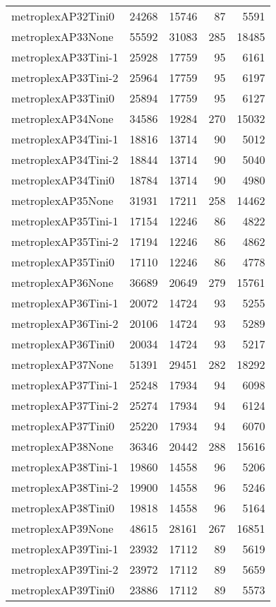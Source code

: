 \begin{longtable}{lrrrr}
metroplexAP32Tini0 & 24268 & 15746 & 87 & 5591 \\
metroplexAP33None & 55592 & 31083 & 285 & 18485 \\
metroplexAP33Tini-1 & 25928 & 17759 & 95 & 6161 \\
metroplexAP33Tini-2 & 25964 & 17759 & 95 & 6197 \\
metroplexAP33Tini0 & 25894 & 17759 & 95 & 6127 \\
metroplexAP34None & 34586 & 19284 & 270 & 15032 \\
metroplexAP34Tini-1 & 18816 & 13714 & 90 & 5012 \\
metroplexAP34Tini-2 & 18844 & 13714 & 90 & 5040 \\
metroplexAP34Tini0 & 18784 & 13714 & 90 & 4980 \\
metroplexAP35None & 31931 & 17211 & 258 & 14462 \\
metroplexAP35Tini-1 & 17154 & 12246 & 86 & 4822 \\
metroplexAP35Tini-2 & 17194 & 12246 & 86 & 4862 \\
metroplexAP35Tini0 & 17110 & 12246 & 86 & 4778 \\
metroplexAP36None & 36689 & 20649 & 279 & 15761 \\
metroplexAP36Tini-1 & 20072 & 14724 & 93 & 5255 \\
metroplexAP36Tini-2 & 20106 & 14724 & 93 & 5289 \\
metroplexAP36Tini0 & 20034 & 14724 & 93 & 5217 \\
metroplexAP37None & 51391 & 29451 & 282 & 18292 \\
metroplexAP37Tini-1 & 25248 & 17934 & 94 & 6098 \\
metroplexAP37Tini-2 & 25274 & 17934 & 94 & 6124 \\
metroplexAP37Tini0 & 25220 & 17934 & 94 & 6070 \\
metroplexAP38None & 36346 & 20442 & 288 & 15616 \\
metroplexAP38Tini-1 & 19860 & 14558 & 96 & 5206 \\
metroplexAP38Tini-2 & 19900 & 14558 & 96 & 5246 \\
metroplexAP38Tini0 & 19818 & 14558 & 96 & 5164 \\
metroplexAP39None & 48615 & 28161 & 267 & 16851 \\
metroplexAP39Tini-1 & 23932 & 17112 & 89 & 5619 \\
metroplexAP39Tini-2 & 23972 & 17112 & 89 & 5659 \\
metroplexAP39Tini0 & 23886 & 17112 & 89 & 5573 \\

\end{longtable}
